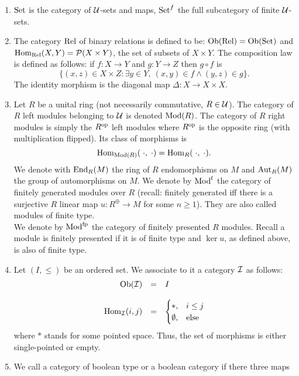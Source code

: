 \begin{enumerate}
\item $\mathrm{Set}$ is the category of $\mathcal{U}$-sets and maps, $\mathrm{Set}^f$ the full subcategory of finite $\mathcal{U}$-sets.
\item The category $\mathrm{Rel}$ of binary relations is defined to be:
$\mathrm{Ob}(\mathrm{Rel}) = \mathrm{Ob}(\mathrm{Set})$ and $\mathrm{Hom}_{\mathrm{Rel}}(X,Y) = \mathcal{P}(X \times Y)$, the set of subsets of $X \times Y$. The composition law is defined as follows: if $f : X \longrightarrow Y$ and $g : Y \longrightarrow Z$ then $g \circ f$ is
$$\{(x,z) \in X \times Z : \exists y \in Y,\ (x,y) \in f \wedge (y,z) \in g\}.$$
The identity morphism is the diagonal map $\Delta : X \longrightarrow X \times X$.
\item  Let $R$ be a unital ring (not necessarily commutative, $R \in \mathcal{U}$). The category of $R$ left modules belonging to $\mathcal{U}$  is denoted $\mathrm{Mod}(R)$. The category of $R$ right modules is simply the $R^{\mathrm{op}}$ left modules where $R^{\mathrm{op}}$ is the opposite ring (with multiplication flipped). Its class of morphisms is
$$\mathrm{Hom}_{\mathrm{Mod}(R)}(\;\cdot,\;\cdot) = \mathrm{Hom}_{R}(\;\cdot,\;\cdot).$$
We denote with $\mathrm{End}_R(M)$ the ring of $R$ endomorphisms on $M$ and $\mathrm{Aut}_R(M)$ the group of automorphisms on $M$. We denote by $\mathrm{Mod}^{\mathrm{f}}$ the category of finitely generated modules over $R$ (recall: finitely generated iff there is a surjective $R$ linear map $u : R^\oplus \longrightarrow M$ for some $n \geq 1$). They are also called modules of finite type.\\
\indent We denote by $\mathrm{Mod}^{\mathrm{fp}}$ the category of finitely presented $R$ modules. Recall a module is finitely presented if it is of finite type and $\ker u$, as defined above, is also of finite type.
\item Let $(I,\leq)$ be an ordered set. We associate to it a category $\mathcal{I}$ as follows:
$$\begin{array}{rcl}
\mathrm{Ob}(\mathcal{I}) &=& I\\
&&\\
\mathrm{Hom}_{\mathcal{I}}(i,j) &=& \begin{cases}
\ast,& i \leq j\\
\emptyset, & \mathrm{else}\\
\end{cases}\\
\end{array}$$
where $\ast$ stands for some pointed space. Thus, the set of morphisms is either single-pointed or empty.
\item We call a category of boolean type or a boolean category if there three maps

\end{enumerate}
